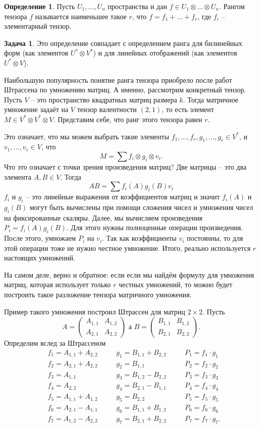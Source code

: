 \documentclass[12pt,a4paper,oneside]{book}
\theoremstyle{definition}
\newtheorem{zad}{\color{violet!100!black}Задача}
\newtheorem*{defn}{\color{yellow!30!red} Определение}
\def\dfn{\begin{defn}}
\def\edfn{\end{defn}}
\def\zd{\begin{zad}}
\def\ezd{\end{zad}}
\def\pmat{\begin{pmatrix}}
\def\epmat{\end{pmatrix}}
\begin{document}
\dfn Пусть $U_1,\dots, U_n$ пространства и дан $f\in U_1 \otimes \dots \otimes U_n$. Рангом тензора $f$ называется наименьшее такое $r$, что $f=f_1+\dots+f_r$, где $f_i$ -- элементарный тензор.
\edfn

\zd Это определение совпадает с определением ранга для билинейных форм (как элементов $U^*\otimes V^*$) и для линейных отображений (как элементов $U^* \otimes V$).
\ezd

Наибольшую популярность понятие ранга тензора приобрело после работ Штрассена по умножению матриц. А именно, рассмотрим конкретный тензор. Пусть $V$ -- это пространство квадратных матриц размера $k$. Тогда матричное умножение задаёт на $V$ тензор валентности $(2,1)$, то есть элемент $M\in V^*\otimes V^* \otimes V$. Представим себе, что ранг этого тензора равен $r$.

Это означает, что мы можем выбрать такие элементы $f_1,\dots,f_r, g_1, \dots, g_r \in V^*$, и $v_1,\dots,v_r \in V$, что
$$M= \sum f_i\otimes g_i \otimes v_i.$$
Что это означает с точки зрения произведения матриц? Две матрицы -- это два элемента $A,B \in V$. Тогда 
$$AB=\sum f_i(A)g_i(B)v_i$$
$f_i$ и $g_i$ -- это линейные выражения от коэффициентов матриц и значит  $f_i(A)$ и $g_i(B)$ могут быть вычислены при помощи сложения чисел и умножения чисел на фиксированные скаляры. Далее, мы вычисляем произведения $P_i=f_i(A)g_i(B)$. Для этого нужны полноценные операции произведения. После этого, умножаем $P_i$ на $v_i$. Так как коэффициенты $v_i$ постоянны, то для этой операции тоже не нужно честное умножение. Итого, реально используется $r$ настоящих умножений. 

На самом деле, верно и обратное: если если мы найдём формулу для умножения матриц, которая использует только $r$ честных умножений, то можно будет построить такое разложение тензора матричного умножения. 

Пример такого умножения построил Штрассен для матриц $2\times 2$. Пусть 
$$A=\pmat A_{1,1} & A_{1,2} \\ A_{2,1} & A_{2,2} \epmat \text{ а } B=\pmat B_{1,1} & B_{1,2} \\ B_{2,1} & B_{2,2} \epmat.$$
Определим вслед за Штрассеном
$$
\begin{aligned}
&f_1=A_{1,1}+ A_{2,2} &\quad & g_1= B_{1,1}+B_{2,2} &\quad & P_1=f_1\cdot g_1\\
&f_2=A_{2,1}+A_{2,2} &\quad & g_2=B_{1,1}&\quad & P_2=f_2\cdot g_2\\
&f_3=A_{1,1}&\quad & g_3=B_{1,2}-B_{2,2}  &\quad & P_3=f_3\cdot g_3\\
&f_4=A_{2,2}&\quad & g_4=B_{2,1}-B_{1,1} &\quad & P_4=f_4\cdot g_4\\
&f_5=A_{1,1}+A_{1,2}&\quad & g_5=B_{2,2} &\quad & P_5=f_5\cdot g_5\\
&f_6=A_{2,1}-A_{1,1}&\quad & g_6=B_{1,1}+B_{1,2} &\quad & P_6=f_6\cdot g_6\\
&f_7=A_{1,2}-A_{2,2}&\quad & g_7=B_{2,1}+B_{2,2} &\quad & P_7=f_7\cdot g_7.
\end{aligned}
$$
\end{document}
